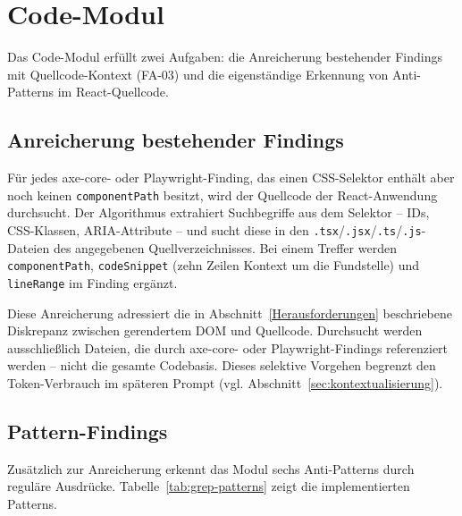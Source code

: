 \section{Code-Modul}
\label{sec:impl-code}

Das Code-Modul erfüllt zwei Aufgaben: die Anreicherung bestehender Findings mit Quellcode-Kontext (\ac{FA}-03) und die eigenständige Erkennung von Anti-Patterns im React-Quellcode.

\subsection{Anreicherung bestehender Findings}

Für jedes axe-core- oder Playwright-Finding, das einen CSS-Selektor enthält aber noch keinen \texttt{componentPath} besitzt, wird der Quellcode der React-Anwendung durchsucht. Der Algorithmus extrahiert Suchbegriffe aus dem Selektor -- IDs, CSS-Klassen, ARIA-Attribute -- und sucht diese in den \texttt{.tsx}/\texttt{.jsx}/\texttt{.ts}/\texttt{.js}-Dateien des angegebenen Quellverzeichnisses. Bei einem Treffer werden \texttt{componentPath}, \texttt{codeSnippet} (zehn Zeilen Kontext um die Fundstelle) und \texttt{lineRange} im Finding ergänzt.

Diese Anreicherung adressiert die in Abschnitt~\ref{Herausforderungen} beschriebene Diskrepanz zwischen gerendertem \ac{DOM} und Quellcode. Durchsucht werden ausschließlich Dateien, die durch axe-core- oder Playwright-Findings referenziert werden -- nicht die gesamte Codebasis. Dieses selektive Vorgehen begrenzt den Token-Verbrauch im späteren Prompt (vgl. Abschnitt~\ref{sec:kontextualisierung}).

\subsection{Pattern-Findings}

Zusätzlich zur Anreicherung erkennt das Modul sechs Anti-Patterns durch reguläre Ausdrücke. Tabelle~\ref{tab:grep-patterns} zeigt die implementierten Patterns.

